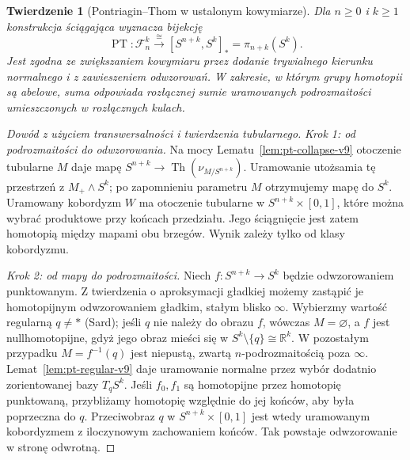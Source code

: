 \documentclass[11pt,a4paper,oneside]{report}
\newcommand{\R}{\mathbb{R}}
\theoremstyle{plain}
\newtheorem{twierdzenie}{Twierdzenie}[section]
\theoremstyle{definition}
\theoremstyle{remark}
\begin{document}
\begin{twierdzenie}[Pontriagin--Thom w ustalonym kowymiarze]
\label{thm:pt-framed-v9}
Dla $n\ge0$ i $k\ge1$ konstrukcja ściągająca
wyznacza bijekcję
\[
\operatorname{PT}:\mathcal F_n^k\xrightarrow{\cong}
[S^{n+k},S^k]_*=\pi_{n+k}(S^k).
\]
Jest zgodna ze zwiększaniem kowymiaru przez dodanie
trywialnego kierunku normalnego i z zawieszeniem
odwzorowań. W zakresie, w którym grupy homotopii
są abelowe, suma odpowiada rozłącznej sumie
uramowanych podrozmaitości umieszczonych w rozłącznych
kulach.
\end{twierdzenie}
\begin{proof}[Dowód z użyciem transwersalności i twierdzenia tubularnego]
\emph{Krok 1: od podrozmaitości do odwzorowania.}
Na mocy Lematu~\ref{lem:pt-collapse-v9} otoczenie tubularne
$M$ daje mapę $S^{n+k}\to\operatorname{Th}(\nu_{M/S^{n+k}})$.
Uramowanie utożsamia tę przestrzeń z $M_+\wedge S^k$;
po zapomnieniu parametru $M$ otrzymujemy mapę do $S^k$.
Uramowany kobordyzm $W$ ma otoczenie tubularne w
$S^{n+k}\times[0,1]$, które można wybrać produktowe
przy końcach przedziału. Jego ściągnięcie jest zatem
homotopią między mapami obu brzegów.
Wynik zależy tylko od klasy kobordyzmu.

\emph{Krok 2: od mapy do podrozmaitości.}
Niech $f:S^{n+k}\to S^k$ będzie odwzorowaniem
punktowanym. Z twierdzenia o aproksymacji gładkiej
możemy zastąpić je homotopijnym odwzorowaniem gładkim,
stałym blisko $\infty$. Wybierzmy wartość regularną
$q\ne*$ (Sard); jeśli $q$ nie należy do obrazu $f$,
wówczas $M=\varnothing$, a $f$ jest nullhomotopijne, gdyż
jego obraz mieści się w $S^k\setminus\{q\}\cong\R^k$.
W pozostałym przypadku $M=f^{-1}(q)$ jest niepustą, zwartą
$n$-podrozmaitością poza $\infty$.
Lemat~\ref{lem:pt-regular-v9} daje uramowanie normalne
przez wybór dodatnio zorientowanej bazy $T_qS^k$.
Jeśli $f_0,f_1$ są homotopijne przez homotopię punktowaną,
przybliżamy homotopię względnie do jej końców,
aby była poprzeczna do $q$. Przeciwobraz $q$
w $S^{n+k}\times[0,1]$ jest wtedy uramowanym
kobordyzmem z iloczynowym zachowaniem końców.
Tak powstaje odwzorowanie w stronę odwrotną.


\end{proof}
\end{document}
